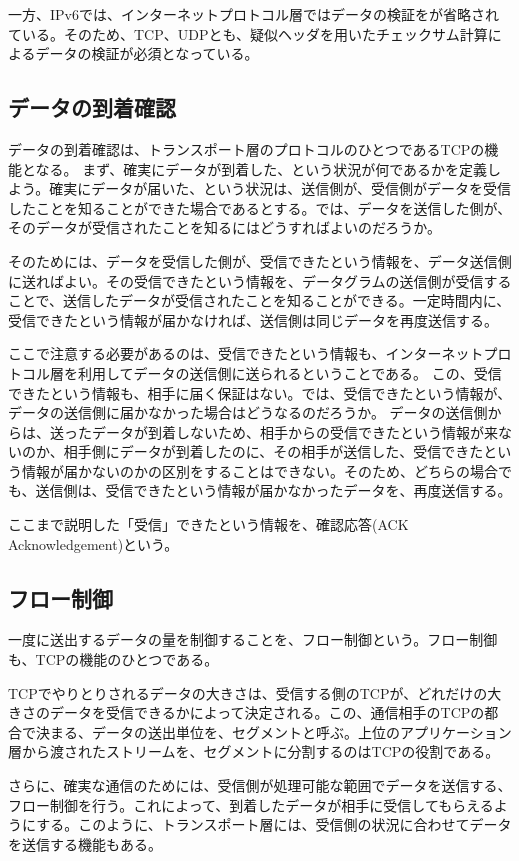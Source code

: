 一方、IPv6では、インターネットプロトコル層ではデータの検証をが省略されている。そのため、TCP、UDPとも、疑似ヘッダを用いたチェックサム計算によるデータの検証が必須となっている。

\subsection{データの到着確認}

データの到着確認は、トランスポート層のプロトコルのひとつであるTCPの機能となる。
まず、確実にデータが到着した、という状況が何であるかを定義しよう。確実にデータが届いた、という状況は、送信側が、受信側がデータを受信したことを知ることができた場合であるとする。では、データを送信した側が、そのデータが受信されたことを知るにはどうすればよいのだろうか。

そのためには、データを受信した側が、受信できたという情報を、データ送信側に送ればよい。その受信できたという情報を、データグラムの送信側が受信することで、送信したデータが受信されたことを知ることができる。一定時間内に、受信できたという情報が届かなければ、送信側は同じデータを再度送信する。

ここで注意する必要があるのは、受信できたという情報も、インターネットプロトコル層を利用してデータの送信側に送られるということである。
この、受信できたという情報も、相手に届く保証はない。では、受信できたという情報が、データの送信側に届かなかった場合はどうなるのだろうか。
データの送信側からは、送ったデータが到着しないため、相手からの受信できたという情報が来ないのか、相手側にデータが到着したのに、その相手が送信した、受信できたという情報が届かないのかの区別をすることはできない。そのため、どちらの場合でも、送信側は、受信できたという情報が届かなかったデータを、再度送信する。

ここまで説明した「受信」できたという情報を、確認応答(ACK Acknowledgement)という。

\subsection{フロー制御}

一度に送出するデータの量を制御することを、フロー制御という。フロー制御も、TCPの機能のひとつである。

TCPでやりとりされるデータの大きさは、受信する側のTCPが、どれだけの大きさのデータを受信できるかによって決定される。この、通信相手のTCPの都合で決まる、データの送出単位を、セグメントと呼ぶ。上位のアプリケーション層から渡されたストリームを、セグメントに分割するのはTCPの役割である。

さらに、確実な通信のためには、受信側が処理可能な範囲でデータを送信する、フロー制御を行う。これによって、到着したデータが相手に受信してもらえるようにする。このように、トランスポート層には、受信側の状況に合わせてデータを送信する機能もある。

